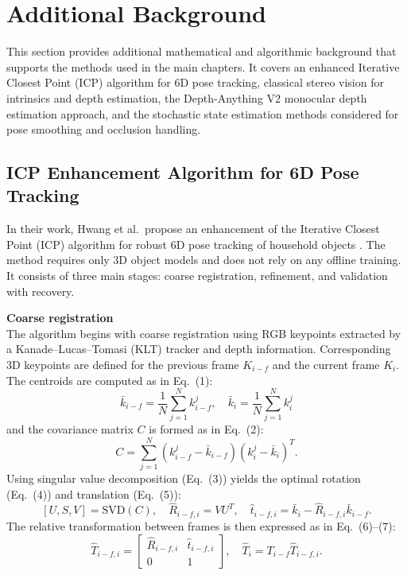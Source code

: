 \appendix

\section{Additional Background}
\label{sec:appendix-additional-background}

This section provides additional mathematical and algorithmic background that supports the methods used in the main chapters. It covers an enhanced Iterative Closest Point (ICP) algorithm for 6D pose tracking, classical stereo vision for intrinsics and depth estimation, the Depth-Anything V2 monocular depth estimation approach, and the stochastic state estimation methods considered for pose smoothing and occlusion handling.

\subsection{ICP Enhancement Algorithm for 6D Pose Tracking}
\label{appendix:icp}

In their work, Hwang et al.\ propose an enhancement of the Iterative Closest Point (ICP) algorithm for robust 6D pose tracking of household objects \cite{hwang2025icp}. The method requires only 3D object models and does not rely on any offline training. It consists of three main stages: coarse registration, refinement, and validation with recovery.

\textbf{Coarse registration} \\
The algorithm begins with coarse registration using RGB keypoints extracted by a Kanade–Lucas–Tomasi (KLT) tracker and depth information. Corresponding 3D keypoints are defined for the previous frame $K_{i-f}$ and the current frame $K_i$. The centroids are computed as in Eq.~(1):
\[
\bar{k}_{i-f} = \frac{1}{N}\sum_{j=1}^N k^j_{i-f}, \quad 
\bar{k}_i = \frac{1}{N}\sum_{j=1}^N k^j_i
\]
and the covariance matrix $C$ is formed as in Eq.~(2):
\[
C = \sum_{j=1}^N (k^j_{i-f} - \bar{k}_{i-f})(k^j_i - \bar{k}_i)^T.
\]
Using singular value decomposition (Eq.~(3)) yields the optimal rotation (Eq.~(4)) and translation (Eq.~(5)):
\[
[U,S,V] = \mathrm{SVD}(C), \quad 
\hat{R}_{i-f,i} = VU^T, \quad
\hat{t}_{i-f,i} = \bar{k}_i - \hat{R}_{i-f,i}\bar{k}_{i-f}.
\]
The relative transformation between frames is then expressed as in Eq.~(6)–(7):
\[
\hat{T}_{i-f,i} =
\begin{bmatrix}
\hat{R}_{i-f,i} & \hat{t}_{i-f,i} \\ 0 & 1
\end{bmatrix}, 
\quad \hat{T}_i = T_{i-f}\hat{T}_{i-f,i}.
\]

